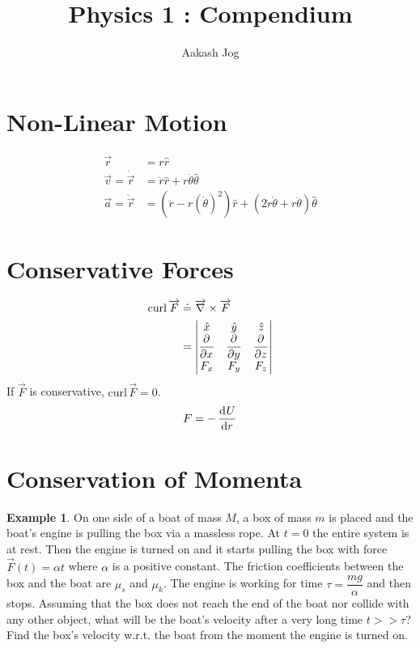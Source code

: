 \documentclass[fleqn, a5paper]{amsart}
\title{Physics 1 : Compendium}
\author{Aakash Jog}
\theoremstyle{definition}
\newtheorem{example}{Example}
\theoremstyle{theorem}
\newcommand{\curl}{\mathrm{curl\,}}
\begin{document}
\maketitle

\section{Non-Linear Motion}

\begin{align*}
	\overrightarrow{r} &= r \hat{r} \\
	\overrightarrow{v} = \dot{\overrightarrow{r}} &= \dot{r} \hat{r} + r \dot{\theta} \hat{\theta} \\
	\overrightarrow{a} = \ddot{\overrightarrow{r}} &= \left(\ddot{r} - r(\dot{\theta})^2\right) \hat{r} + \left(2 \dot{r} \dot{\theta} + r \ddot{\theta}\right) \hat{\theta}
\end{align*}

\section{Conservative Forces}
	\begin{align*}
		\curl \overrightarrow{F} &\doteq \overrightarrow{\nabla} \times \overrightarrow{F} \\
		&=
			\begin{vmatrix} 
				\hat{x} & \hat{y} & \hat{z} \\
				\dpd{}{x} & \dpd{}{y} & \dpd{}{z} \\
				F_x & F_y & F_z \\
			\end{vmatrix}
	\end{align*}
	If $\overrightarrow{F}$ is conservative, $\curl \overrightarrow{F} = 0$.
	\begin{equation*}
		F = - \dod{U}{r}
	\end{equation*}
\section{Conservation of Momenta}

\begin{example}
	On one side of a boat of mass $M$, a box of mass $m$ is placed and the boat's engine is pulling the box via a massless rope. At $t = 0$ the entire system is at rest. Then the engine is turned on and it starts pulling the box with force $\overrightarrow{F}(t) = \alpha t$ where $\alpha$ is a positive constant. The friction coefficients between the box and the boat are $\mu_s$ and $\mu_k$. The engine is working for time $\tau = \dfrac{mg}{\alpha}$ and then stops. Assuming that the box does not reach the end of the boat nor collide with any other object, what will be the boat's velocity after a very long time $t >> \tau$? Find the box's velocity w.r.t. the boat from the moment the engine is turned on.
\end{example}
\end{document}
